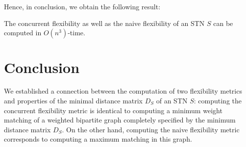 Hence, in conclusion, we obtain the following result:

\begin{proposition}
The concurrent flexibility as well as the naive flexibility of an STN $S$ can be computed in $O(n^3)$-time.
\end{proposition}

\section{Conclusion}
We established a connection between the computation of two flexibility metrics and properties of the minimal distance matrix $D_S$ of an STN $S$: computing the concurrent flexibility metric is identical to computing a minimum weight matching of a weighted bipartite graph completely specified by the minimum distance matrix $D_S$. On the other hand, computing the naive flexibility metric corresponds to computing a maximum matching in this graph.


%
%
%
